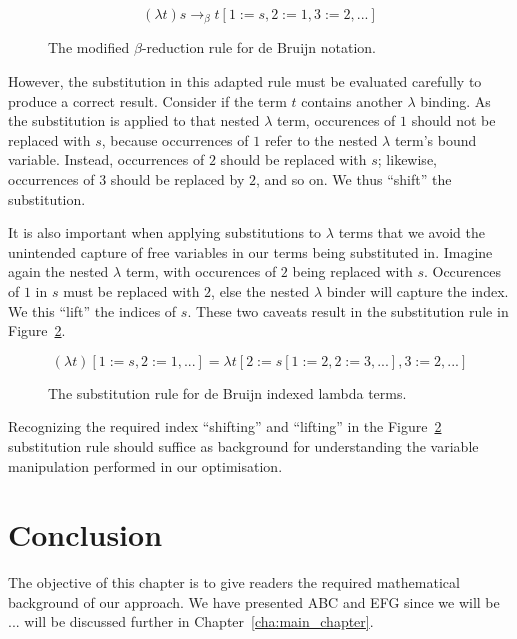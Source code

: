 \begin{figure}
\begin{equation*}
(\lambda t)s \to_{\beta} t[1 := s, 2 := 1, 3 := 2, ...]
\end{equation*}
\caption{The modified $\beta$-reduction rule for de Bruijn notation.}
\label{eq:beta_rule2}
\end{figure}

However, the substitution in this adapted rule must be evaluated carefully to produce a correct result. Consider if the term $t$ contains another $\lambda$ binding. As the substitution is applied to that nested $\lambda$ term, occurences of $1$ should not be replaced with $s$, because occurrences of $1$ refer to the nested $\lambda$ term's bound variable. Instead, occurrences of $2$ should be replaced with $s$; likewise, occurrences of $3$ should be replaced by $2$, and so on. We thus ``shift'' the substitution.\cite{abadi1991}

It is also important when applying substitutions to $\lambda$ terms that we avoid the unintended capture of free variables in our terms being substituted in. Imagine again the nested $\lambda$ term, with occurences of $2$ being replaced with $s$. Occurences of $1$ in $s$ must be replaced with $2$, else the nested $\lambda$ binder will capture the index. We this ``lift'' the indices of $s$. These two caveats result in the substitution rule in Figure~\ref{eq:debruijn_sub}.\cite{abadi1991}

\begin{figure}
\begin{equation*}
(\lambda t)[1 := s, 2 := 1, ...] = \lambda t[2 := s[1 := 2, 2 := 3, ...], 3 := 2, ...]
\end{equation*}
\caption{The substitution rule for de Bruijn indexed lambda terms.}
\label{eq:debruijn_sub}
\end{figure}

Recognizing the required index ``shifting'' and ``lifting'' in the Figure~\ref{eq:debruijn_sub} substitution rule should suffice as background for understanding the variable manipulation performed in our optimisation.




\section{Conclusion}
\label{sec:background_conclusion}

The objective of this chapter is to give readers the required mathematical background of our approach. We have presented ABC and EFG since we will be ...  will be discussed further in Chapter~\ref{cha:main_chapter}.

